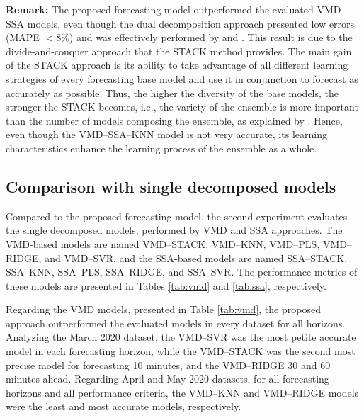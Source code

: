 \textbf{Remark:} The proposed forecasting model outperformed the evaluated \ac{VMD}--\ac{SSA} models, even though the dual decomposition approach presented low errors (\ac{MAPE} $< 8\%$) and was effectively performed by  and . This result is due to the divide-and-conquer approach that the \ac{STACK} method provides. The main gain of the \ac{STACK} approach is its ability to take advantage of all different learning strategies of every forecasting base model and use it in conjunction to forecast as accurately as possible. Thus, the higher the diversity of the base models, the stronger the \ac{STACK} becomes, i.e., the variety of the ensemble is more important than the number of models composing the ensemble, as explained by . Hence, even though the \ac{VMD}--\ac{SSA}--\ac{KNN} model is not very accurate, its learning characteristics enhance the learning process of the ensemble as a whole.

\subsection{Comparison with single decomposed models \label{subsec:singledec}}
Compared to the proposed forecasting model, the second experiment evaluates the single decomposed models, performed by \ac{VMD} and \ac{SSA} approaches. The \ac{VMD}-based models are named \ac{VMD}--\ac{STACK}, \ac{VMD}--\ac{KNN}, \ac{VMD}--\ac{PLS}, \ac{VMD}--\ac{RIDGE}, and \ac{VMD}--\ac{SVR}, and the \ac{SSA}-based models are named \ac{SSA}--\ac{STACK}, \ac{SSA}--\ac{KNN}, \ac{SSA}--\ac{PLS}, \ac{SSA}--\ac{RIDGE}, and \ac{SSA}--\ac{SVR}. The performance metrics of these models are presented in Tables \ref{tab:vmd} and \ref{tab:ssa}, respectively.

Regarding the \ac{VMD} models, presented in Table \ref{tab:vmd}, the proposed approach outperformed the evaluated models in every dataset for all horizons. Analyzing the March 2020 dataset, the \ac{VMD}--\ac{SVR} was the most petite accurate model in each forecasting horizon, while the \ac{VMD}--\ac{STACK} was the second most precise model for forecasting 10 minutes, and the \ac{VMD}--\ac{RIDGE} 30 and 60 minutes ahead. Regarding April and May 2020 datasets, for all forecasting horizons and all performance criteria, the \ac{VMD}--\ac{KNN} and \ac{VMD}--\ac{RIDGE} models were the least and most accurate models, respectively. 

